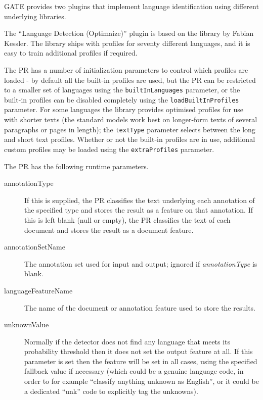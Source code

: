 GATE provides two plugins that implement language identification using
different underlying libraries.


The ``Language Detection (Optimaize)'' plugin is based on the
 library by Fabian Kessler.  The library ships with profiles for seventy
different languages, and it is easy to train additional profiles if required.

The PR has a number of initialization parameters to control which profiles are
loaded - by default all the built-in profiles are used, but the PR can be
restricted to a smaller set of languages using the \texttt{builtInLanguages}
parameter, or the built-in profiles can be disabled completely using the
\texttt{loadBuiltInProfiles} parameter.  For some languages the library
provides optimised profiles for use with shorter texts (the standard models
work best on longer-form texts of several paragraphs or pages in length);
the \texttt{textType} parameter selects between the long and short text
profiles.  Whether or not the built-in profiles are in use, additional custom
profiles may be loaded using the \texttt{extraProfiles} parameter.

The PR has the following runtime parameters.
\begin{description}
\item[annotationType] If this is supplied, the PR classifies the text underlying
  each annotation of the specified type and stores the result as a feature on
  that annotation.  If this is left blank (null or empty), the PR classifies the
  text of each document and stores the result as a document feature.
\item[annotationSetName] The annotation set used for input and output; ignored
  if \emph{annotationType} is blank.
\item[languageFeatureName] The name of the document or annotation feature used
  to store the results.
\item[unknownValue] Normally if the detector does not find any language that
  meets its probability threshold then it does not set the output feature at all.
  If this parameter is set then the feature will be set in all cases, using
  the specified fallback value if necessary (which could be a genuine language
  code, in order to for example ``classify anything unknown as English'', or
  it could be a dedicated ``unk'' code to explicitly tag the unknowns).
\end{description}


